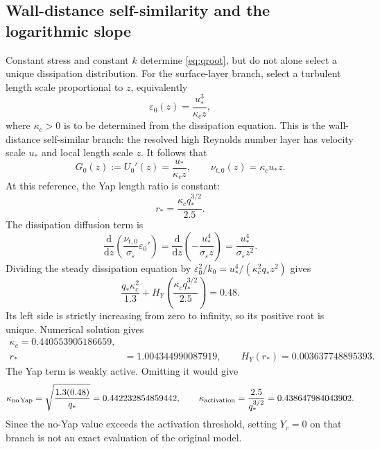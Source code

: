 \documentclass[11pt,a4paper]{article}
\numberwithin{equation}{section}
\newcommand{\dd}{\mathrm{d}}
\newcommand{\eps}{\varepsilon}
\newcommand{\ust}{u_*}
\newcommand{\kc}{\kappa_c}
\newcommand{\qs}{q_*}
\begin{document}
\subsection{Wall-distance self-similarity and the logarithmic slope}
Constant stress and constant $k$ determine \cref{eq:qroot}, but do not alone
select a unique dissipation distribution. For the surface-layer branch,
select a turbulent length scale proportional to $z$, equivalently
\begin{equation}
 \eps_0(z)=\frac{\ust^3}{\kc z},
 \label{eq:epsref}
\end{equation}
where $\kc>0$ is to be determined from the dissipation equation.
This is the wall-distance self-similar branch: the resolved high Reynolds
number layer has velocity scale $\ust$ and local length scale $z$.
It follows that
\begin{equation}
 G_0(z):=U_0'(z)=\frac{\ust}{\kc z},\qquad \nu_{t,0}(z)=\kc\ust z.
 \label{eq:Gnutref}
\end{equation}
At this reference, the Yap length ratio is constant:
\begin{equation}
 r_*=\frac{\kc\qs^{3/2}}{2.5}.
 \label{eq:rstar}
\end{equation}
The dissipation diffusion term is
\begin{equation}
 \frac{\dd}{\dd z}
 \left(\frac{\nu_{t,0}}{\sigma_\eps}\eps_0'\right)
 =\frac{\dd}{\dd z}\left(-\frac{\ust^4}{\sigma_\eps z}\right)
 =\frac{\ust^4}{\sigma_\eps z^2}.
 \label{eq:epsdiff}
\end{equation}
Dividing the steady dissipation equation by
$\eps_0^2/k_0=\ust^4/(\kc^2\qs z^2)$ gives
\begin{equation}
 \boxed{
 \frac{\qs\kc^2}{1.3}
 +H_Y\!\left(\frac{\kc\qs^{3/2}}{2.5}\right)=0.48.}
 \label{eq:kappaeq}
\end{equation}
Its left side is strictly increasing from zero to infinity, so its positive
root is unique. Numerical solution gives
\begin{align}
 \boxed{\kc=0.440553905186659,}
 \label{eq:kappanum}\\
 r_*&=1.004344990087919,\qquad
 H_Y(r_*)=0.003637748895393.
 \label{eq:Yapnum}
\end{align}
The Yap term is weakly active. Omitting it would give
\begin{equation}
 \kappa_{\rm no\,Yap}
 =\sqrt{\frac{1.3(0.48)}{\qs}}
 =0.442232854859442,\qquad
 \kappa_{\rm activation}=\frac{2.5}{\qs^{3/2}}
 =0.438647984043902.
\end{equation}
Since the no-Yap value exceeds the activation threshold, setting $Y_c=0$
on that branch is not an exact evaluation of the original model.
\end{document}
